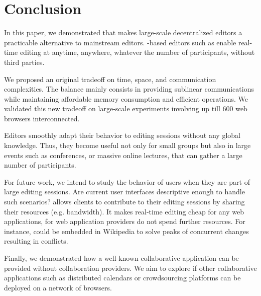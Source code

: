 
\section{Conclusion}
\label{sec:conclusion}

In this paper, we demonstrated that \LSEQ makes large-scale decentralized
editors a practicable alternative to mainstream editors. \LSEQ-based editors
such as \CRATE enable real-time editing at anytime, anywhere, whatever the number
of participants, without third parties.

We proposed an original tradeoff on time, space, and communication
complexities. The balance mainly consists in providing sublinear communications
while maintaining affordable memory consumption and efficient operations.  We
validated this new tradeoff on large-scale experiments involving up till 600 web
browsers interconnected.

Editors smoothly adapt their behavior to editing sessions without any global
knowledge. Thus, they become useful not only for small groups but also in large
events such as conferences, or massive online lectures, that can gather a large
number of participants.

For future work, we intend to study the behavior of users when they are part of
large editing sessions. Are current user interfaces descriptive enough to handle
such scenarios?  \CRATE allows clients to contribute to their editing sessions
by sharing their resources (e.g. bandwidth).  It makes real-time editing cheap
for any web applications, for web application providers do not spend further
resources. For instance, \CRATE could be embedded in Wikipedia to solve peaks of
concurrent changes resulting in conflicts.

Finally, we demonstrated how a well-known collaborative application can be
provided without collaboration providers. We aim to explore if other
collaborative applications such as distributed calendars or crowdsourcing
platforms can be deployed on a network of browsers.

